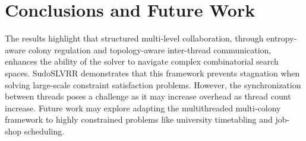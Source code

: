 \section{Conclusions and Future Work}
The results highlight that structured multi-level collaboration, through entropy-aware colony regulation and topology-aware inter-thread communication, enhances the ability of the solver to navigate complex combinatorial search spaces. SudoSLVRR demonstrates that this framework prevents stagnation when solving large-scale constraint satisfaction problems. However, the synchronization between threads poses a challenge as it may increase overhead as thread count increase.
Future work may explore adapting the multithreaded multi-colony framework to highly constrained problems like university timetabling and job-shop scheduling. 
